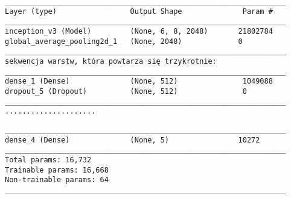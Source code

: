 \newsavebox\myvfff
\begin{lrbox}{\myvfff}
\setlength{\myminipagewidth}{0.9\linewidth} %
\setlength{\myminipagecentering}{(\linewidth-\myminipagewidth)/2}
\noindent\hspace{\myminipagecentering}\begin{minipage}{\myminipagewidth}
\begin{verbatim}
_________________________________________________________________
Layer (type)                 Output Shape              Param #   
_________________________________________________________________
inception_v3 (Model)         (None, 6, 8, 2048)       21802784  
global_average_pooling2d_1   (None, 2048)             0           
_________________________________________________________________
sekwencja warstw, która powtarza się trzykrotnie:
_________________________________________________________________
dense_1 (Dense)              (None, 512)               1049088     
dropout_5 (Dropout)          (None, 512)               0        
_________________________________________________________________
.....................

\end{verbatim} 
\end{minipage}\end{lrbox}
\resizebox{0.75\textwidth}{!}{\usebox\myvfff}

\newsavebox\myvff
\begin{lrbox}{\myvff}
\setlength{\myminipagewidth}{0.9\linewidth} %
\setlength{\myminipagecentering}{(\linewidth-\myminipagewidth)/2}
\noindent\hspace{\myminipagecentering}\begin{minipage}{\myminipagewidth}
\begin{verbatim}
_________________________________________________________________
dense_4 (Dense)              (None, 5)                10272     
_________________________________________________________________
Total params: 16,732
Trainable params: 16,668
Non-trainable params: 64
_________________________________________________________________
\end{verbatim} 
\end{minipage}\end{lrbox}
\resizebox{0.75\textwidth}{!}{\usebox\myvff}


